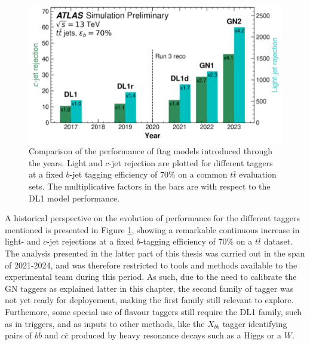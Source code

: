 \begin{figure}[h!]
  \center
  \includegraphics[scale=0.6]{Images/FTAG/storyFtag.png}
  \caption{Comparison of the performance of \gls{ftag} models introduced through the years. Light and $c$-jet rejection are plotted for different taggers at a fixed $b$-jet tagging efficiency of 70\% on a common $t\bar{t}$ evaluation sets. The multiplicative factors in the bars are with respect to the DL1 model performance.} 
  \label{fig:storyFtag}
\end{figure}

A historical perspective on the evolution of performance for the different taggers mentioned is presented in Figure \ref{fig:storyFtag}, showing a remarkable continuous increase in light- and $c$-jet rejections at a fixed $b$-tagging efficiency of 70\% on a $t\bar{t}$ dataset. The analysis presented in the latter part of this thesis was carried out in the span of 2021-2024, and was therefore restricted to tools and methods available to the experimental team during this period. As such, due to the need to calibrate the GN taggers as explained latter in this chapter, the second family of tagger was not yet ready for deployement, making the first family still relevant to explore. Furthemore, some special use of flavour taggers still require the DL1 family, such as in triggers, and as inputs to other methods, like the $X_{bb}$ tagger identifying pairs of $b\bar{b}$ and $c\bar{c}$ produced by heavy resonance decays such as a Higgs or a $W$. 

